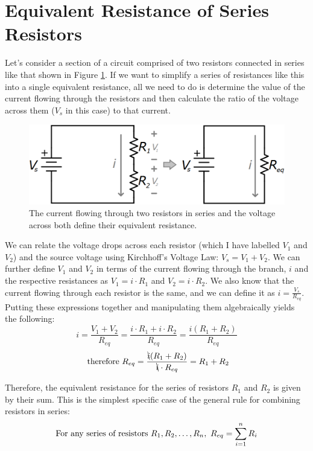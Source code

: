 \section{Equivalent Resistance of Series Resistors}
\label{sec:seriesEquivalent}
Let's consider a section of a circuit comprised of two resistors connected in series like that shown in Figure \ref{twoSeriesToEquivalent}. If we want to simplify a series of resistances like this into a single equivalent resistance, all we need to do is determine the value of the current flowing  through the resistors and then calculate the ratio of the voltage across them ($V_s$ in this case) to that current. 
\begin{figure}[h!]
\centering
\includegraphics[width=13cm]{figures/twoResSeries.png}
\caption{The current flowing through two resistors in series and the voltage across both define their equivalent resistance.}
\label{twoSeriesToEquivalent}
\end{figure}
We can relate the voltage drops across each resistor (which I have labelled $V_1$ and $V_2$) and the source voltage using Kirchhoff's Voltage Law: $V_s = V_1 + V_2$. We can further define $V_1$ and $V_2$ in terms of the current flowing through the branch, $i$ and the respective resistances as $V_1 = i \cdot R_1$ and $V_2 = i \cdot R_2$. We also know that the current flowing through each resistor is the same, and we can define it as $i = \frac{V_s}{R_{eq}}$. Putting these expressions together and manipulating them algebraically yields the following:
$$
i = \frac{V_1 + V_2}{R_{eq}} = \frac{i \cdot R_1 + i \cdot R_2}{R_{eq}} = \frac{i(R_1+R_2)}{R_{eq}}
$$
$$
\textrm{     therefore     }R_{eq} = \frac{\bcancel{i}(R_1+R_2)}{\bcancel{i} \cdot R_{eq}} = R_1 + R_2
$$

Therefore, the equivalent resistance for the series of resistors $R_1$ and $R_2$ is given by their sum. This is the simplest specific case of the general rule for combining resistors in series:
$$
\textnormal{For any series of resistors    } R_1, R_2,\dots, R_n, \textnormal{   }R_{eq} = \sum_{i=1}^n{R_i}
$$
